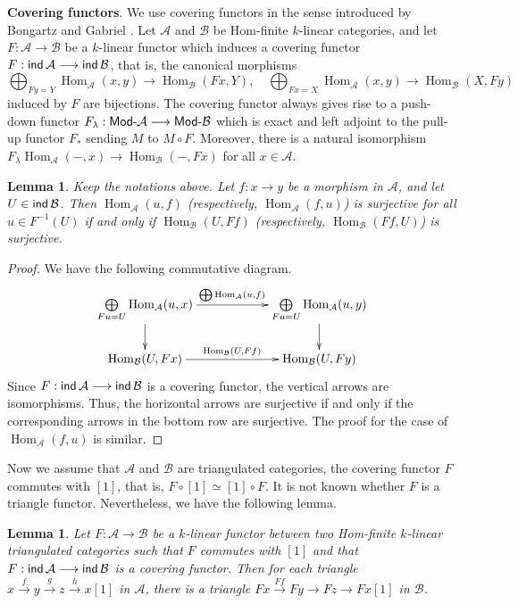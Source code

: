 \documentclass[12pt]{article}
\theoremstyle{plain}
\newtheorem{Lem}[Def]{Lemma}
\theoremstyle{definition}
\DeclareMathOperator{\Hom}{Hom}
\DeclareMathOperator{\ind}{\sf ind}
\def\Modcat#1{{\sf Mod}\mbox{-}{#1}}
\newcommand{\lra}{\longrightarrow}
\newcommand{\lraf}[1]{\stackrel{#1}{\lra}}
\begin{document}
\medskip 
{\bf Covering functors}. We use covering functors in the sense introduced by
Bongartz and Gabriel \cite{BongartzGabriel1982}.  Let $\mathcal{A}$ and
$\mathcal{B}$ be Hom-finite $k$-linear categories, and let
$F:\mathcal{A}\lra \mathcal{B}$ be a $k$-linear functor which induces a
covering functor $F:\ind\mathcal{A}\lra\ind\mathcal{B}$, that is,  
  the canonical morphisms
\[\bigoplus_{Fy=Y}\Hom_{\mathcal{A}}(x,y)\lra \Hom_{\mathcal{B}}(Fx,Y),\quad \bigoplus_{Fx=X}\Hom_{\mathcal{A}}(x,y)\lra\Hom_{\mathcal{B}}(X,Fy)\]
induced by $F$ are bijections. The covering functor always gives rise to a push-down functor 
\(F_{\lambda}: \Modcat{\mathcal{A}}\lra\Modcat{\mathcal{B}}\) which is exact and left adjoint to the pull-up functor $F_*$ sending $M$ to $M\circ F$. Moreover, there is a natural isomorphism 
\(F_{\lambda}\Hom_{\mathcal{A}}(-,x)\lra \Hom_{\mathcal{B}}(-,Fx)\)
for all $x\in \mathcal{A}$.
\begin{Lem}\label{lem-covering-approx}
Keep the notations above. Let $f: x\lra y$ be a morphism in $\mathcal{A}$, and let $U\in\ind\mathcal{B}$. Then $\Hom_{\mathcal{A}}(u, f)$ (respectively, $\Hom_{\mathcal{A}}(f, u)$) is surjective for all $u\in F^{-1}(U)$ if and only if $\Hom_{\mathcal{B}}(U, Ff)$ (respectively, $\Hom_{\mathcal{B}}(Ff, U)$) is surjective.
\end{Lem}
\begin{proof}
We have the following commutative diagram.
\[\xymatrix@C=20mm{
\bigoplus\limits_{Fu=U}\Hom_{\cal A}(u,x) \ar[r]^{\bigoplus\Hom_{\cal A}(u,f)} \ar[d]  & \bigoplus\limits_{Fu=U}\Hom_{\cal A}(u,y) \ar[d] \\
\Hom_{\cal B}(U, Fx) \ar[r]^{\Hom_{\cal B}(U, Ff)} & \Hom_{\cal B}(U, Fy)
}\] 
Since $F:\ind\mathcal{A}\lra \ind\mathcal{B}$ is a covering functor, the vertical arrows are isomorphisms. Thus, the horizontal arrows are surjective if and only if the corresponding arrows in the bottom row are surjective. The proof for the case of $\Hom_{\mathcal{A}}(f, u)$ is similar.
\end{proof}
Now we assume   that $\mathcal{A}$ and $\mathcal{B}$ are triangulated categories, the covering functor $F$  commutes with $[1]$, that is, $F\circ [1]\simeq [1]\circ F$. It is not known whether $F$ is a triangle functor. Nevertheless, we have the following lemma. 
\begin{Lem}\label{lem-covering-triangle}
Let $F:\mathcal{A}\lra \mathcal{B}$ be a $k$-linear functor between two Hom-finite $k$-linear triangulated categories such that $F$ commutes with $[1]$ and that $F:\ind\mathcal{A}\lra \ind\mathcal{B}$ is a covering functor. Then for each triangle $x\lraf{f} y\lraf{g} z\lraf{h} x[1]$ in $\mathcal{A}$,  
there is a triangle $Fx\lraf{Ff} Fy\lra Fz\lra Fx[1]$ in $\mathcal{B}$.
\end{Lem}
\end{document}
